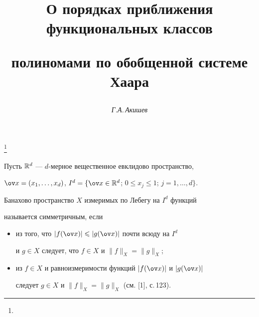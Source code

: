 




\author{\it Г.А.\,Акишев}




\title{О порядках приближения функциональных классов


полиномами по обобщенной системе Хаара}


\thanks{}





\date{}




\pagestyle{plain} %







\maketitle


\label{begin}








Пусть $\Bbb R^{d}$ --- $d$-мерное вещественное евклидово пространство, 


$\ov x=(x_{1},\dotsc,x_{d})$, $I^{d}=\{\ov x\in \Bbb 


R^{d}$; $0\leq x_{j}\leq 1$; $j=1,\dotsc,d\}$.





Банахово пространство $X$ измеримых по Лебегу на  $I^{d}$ функций 


называется симметричным, если


\begin{itemize}


\item[1.] из того, что $|f(\ov x)|\leq |g(\ov x)|$ почти всюду на $I^{d}$ 


и $g\in X$ следует, что $f\in X$ и $\|f\|_{X}=\|g\|_{X}$;


\item[2.] из $f\in X$ и равноизмеримости функций $|f(\ov x)|$ и $|g(\ov x)|$ 


следует $g\in X$ и $\|f\|_{X}=\|g\|_{X}$ (см. [1], с.\,123).


\end{itemize}


